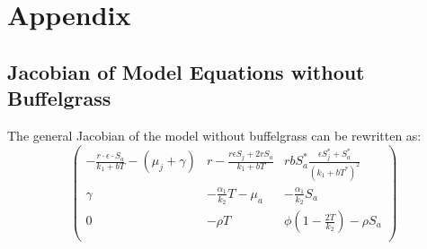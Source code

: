 \documentclass[a4paper]{article}
\begin{document}
\section{Appendix}

\subsection{Jacobian of Model Equations without Buffelgrass}
The general Jacobian of the model without buffelgrass can be rewritten as:
\begin{equation}\label{eq:noBuffelJacobian}
\begin{pmatrix}
-\displaystyle\frac{r\cdot\epsilon\cdot S_a}{k_1 + bT} - (\mu_j + \gamma) & r - \displaystyle\frac{r\epsilon S_j + 2rS_a}{k_1 + bT} & r b S_a^*\displaystyle\frac{\epsilon S_j^*+S_a^*}{(k_1+bT^*)^2}\\
\gamma & -\displaystyle\frac{\alpha_1}{k_2}T - \mu_a&-\displaystyle\frac{\alpha_1}{k_2}S_a\\
0 & -\rho T& \phi\left(1 - \displaystyle\frac{2T}{k_2}\right) - \rho S_a\\
\end{pmatrix}
\end{equation}
\end{document}
